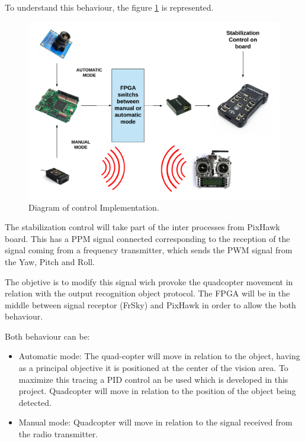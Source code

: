 To understand this behaviour, the figure  \ref{fig:control_implemtation} is represented.

\begin{figure}[H]
	\center
	\includegraphics[trim = 0mm 0cm 0mm 0cm, clip,scale=0.4]{imagenes/Cuadricoptero_vision/control_implementation.pdf}
	\caption{Diagram of control Implementation.}
	\label{fig:control_implemtation}
\end{figure}


The stabilization control will take part of the inter processes from PixHawk board. This has a PPM signal connected corresponding to the reception of the signal coming from a frequency transmitter, which sends the PWM signal from the Yaw, Pitch and Roll. \newline

The objetive is to modify this signal wich provoke the quadcopter movement in relation with the output recognition object protocol. The FPGA will be in the middle between signal receptor (FrSky) and PixHawk in order to allow the both behaviour. 

Both behaviour can be:

\begin{itemize}
	\item Automatic mode: The quad-copter will move in relation to the object, having as a principal objective it is positioned at the center of the vision area. To maximize this tracing a PID control an be used which is developed in this project. Quadcopter will move in relation to the position of the object being detected.
	\item Manual mode: Quadcopter will move in relation to the signal received from the radio transmitter.
\end{itemize}
